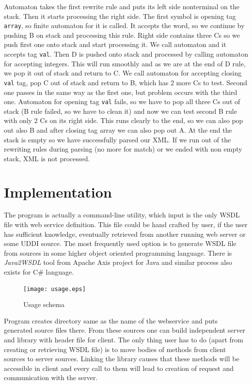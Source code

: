 \documentclass[12pt,notitlepage]{report}
\begin{document}
Automaton takes the first rewrite rule and puts its left side nonterminal on the stack. Then it starts processing the right side. The first symbol is opening tag \texttt{array}, so finite automaton for it is called. It accepts the word, so we continue by pushing B on stack and processing this rule. Right side contains three Cs so we push first one onto stack and start processing it. We call automaton and it accepts tag \texttt{val}. Then D is pushed onto stack and processed by calling automaton for accepting integers. This will run smoothly and as we are at the end of D rule, we pop it out of stack and return to C. We call automaton for accepting closing \texttt{val} tag, pop C out of stack and return to B, which has 2 more Cs to test. Second one passes in the same way as the first one, but problem occurs with the third one. Automaton for opening tag \texttt{val} fails, so we have to pop all three Cs out of stack (B rule failed, so we have to clean it) and now we can test second B rule with only 2 Cs on its right side. This runs clearly to the end, so we can also pop out also B and after closing tag array we can also pop out A. At the end the stack is empty so we have successfully parsed our XML. If we run out of the rewriting rules during parsing (no more for match) or we ended with non empty stack, XML is not processed.

\chapter{Implementation}
\label{implementation}

The program is actually a command-line utility, which input is the only WSDL file with web service definition. This file could be hand crafted by user, if the user has sufficient knowledge, eventually retrieved from another running web server or some UDDI source. The most frequently used option is to generate WSDL file from sources in some higher object oriented programming language. There is \textit{Java2WSDL} tool from Apache Axis project for Java and similar process also exists for C\# language.

\begin{figure}[htb]
 \begin{center}
  \texttt{[image: usage.eps]}
 \end{center}
 \caption{Usage schema}
 \label{usage-schema}
\end{figure}

Program creates directory same as the name of the webservice and puts generated source files there. From these sources one can build independent server and library with header file for client. The only thing user has to do (apart from creating or retrieving WSDL file) is to move bodies of methods from client sources to server sources. Linking the library causes that these methods will be accessible in client and every call to them will lead to creation of request and communication with the server.
\end{document}
